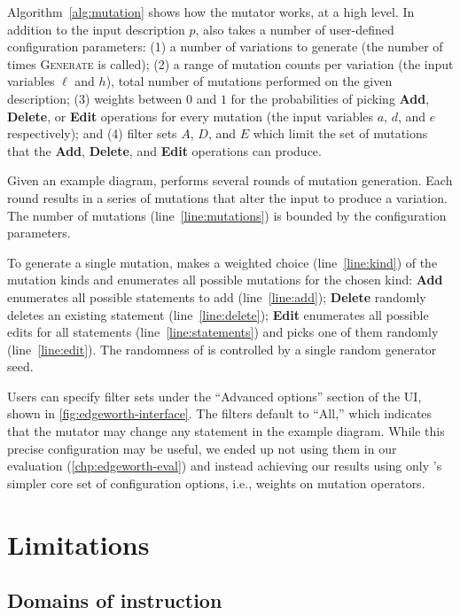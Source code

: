 Algorithm~\ref{alg:mutation} shows how the \Edgeworth mutator works, at a high level. In addition to the input \Substance description $p$, \Edgeworth also takes a number of user-defined configuration parameters: (1) a number of variations to generate (the number of times \textsc{Generate} is called); (2) a range of mutation counts per variation (the input variables $\ell$ and $h$), \ie total number of mutations performed on the given \Substance description; (3) weights between $0$ and $1$ for the probabilities of picking \textbf{Add}, \textbf{Delete}, or \textbf{Edit} operations for every mutation (the input variables $a$, $d$, and $e$ respectively); and (4) filter sets $A$, $D$, and $E$ which limit the set of mutations that the \textbf{Add}, \textbf{Delete}, and \textbf{Edit} operations can produce.

Given an example diagram, \Edgeworth performs several rounds of mutation generation. Each round results in a series of mutations that alter the input to produce a variation. The number of mutations (line~\ref{line:mutations}) is bounded by the configuration parameters.

To generate a single mutation, \Edgeworth makes a weighted choice (line~\ref{line:kind}) of the mutation kinds and enumerates all possible mutations for the chosen kind: \textbf{Add} enumerates all possible statements to add (line~\ref{line:add}); \textbf{Delete} randomly deletes an existing statement (line~\ref{line:delete}); \textbf{Edit} enumerates all possible edits for all statements (line~\ref{line:statements}) and picks one of them randomly (line~\ref{line:edit}). The randomness of \Edgeworth is controlled by a single random generator seed.

Users can specify filter sets under the ``Advanced options'' section of the UI, shown in \cref{fig:edgeworth-interface}. The filters default to ``All,'' which indicates that the mutator may change any statement in the example diagram. While this precise configuration may be useful, we ended up not using them in our evaluation (\cref{chp:edgeworth-eval}) and instead achieving our results using only \Edgeworth's simpler core set of configuration options, i.e., weights on mutation operators.

\section{Limitations}
\label{sec:limitations}

\subsection{Domains of instruction}
\label{sec:extension}

